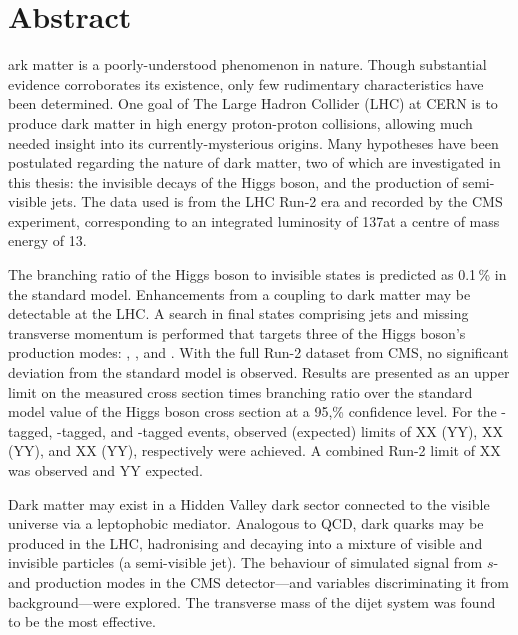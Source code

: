%
%
%

\chapter*{Abstract}
\begin{SingleSpace}
ark matter is a poorly-understood phenomenon in nature. Though substantial evidence corroborates its existence, only few rudimentary characteristics have been determined. One goal of The Large Hadron Collider (LHC) at CERN is to produce dark matter in high energy proton-proton collisions, allowing much needed insight into its currently-mysterious origins. Many hypotheses have been postulated regarding the nature of dark matter, two of which are investigated in this thesis: the invisible decays of the Higgs boson, and the production of semi-visible jets. The data used is from the LHC Run-2 era and recorded by the CMS experiment, corresponding to an integrated luminosity of 137\fbinv at a centre of mass energy of 13\TeV.

The branching ratio of the Higgs boson to invisible states is predicted as 0.1\,\% in the standard model. Enhancements from a coupling to dark matter may be detectable at the LHC. A search in final states comprising jets and missing transverse momentum is performed that targets three of the Higgs boson's production modes: \ttH, \VH, and \ggH. With the full Run-2 dataset from CMS, no significant deviation from the standard model is observed. Results are presented as an upper limit on the measured cross section times branching ratio over the standard model value of the Higgs boson cross section at a 95,\% confidence level. For the \ttH-tagged, \VH-tagged, and \ggH-tagged events, observed (expected) limits of XX (YY), XX (YY), and XX (YY), respectively were achieved. A combined Run-2 limit of XX was observed and YY expected.

Dark matter may exist in a Hidden Valley dark sector connected to the visible universe via a leptophobic mediator. Analogous to QCD, dark quarks may be produced in the LHC, hadronising and decaying into a mixture of visible and invisible particles (a semi-visible jet). The behaviour of simulated signal from $s$- and \tchannel production modes in the CMS detector---and variables discriminating it from background---were explored. The transverse mass of the dijet system was found to be the most effective.
\end{SingleSpace}
\clearpage
